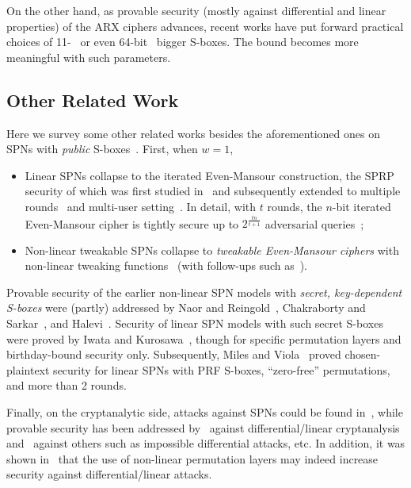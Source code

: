 \documentclass[journal=tosc,final,nohyperref]{iacrtrans}
\begin{document}
On the other hand, as provable security (mostly against differential and linear properties) of the ARX ciphers advances, recent works have put forward practical choices of 11-~\cite{DBLP:journals/tosc/16-bit-Sbox} or even 64-bit~\cite{cryptoeprint:2019:1378} bigger S-boxes. The bound becomes more meaningful with such parameters.




\subsection{Other Related Work}


Here we survey some other related works besides the aforementioned ones on SPNs with {\it public} S-boxes~\cite{EC:DSSL16,EPRINT:DKSTZ17,EPRINT:CogLee18,C:CDKLST18}. First, when $w=1$,
%
\begin{itemize}
	\item Linear SPNs collapse to the iterated Even-Mansour construction, the SPRP security of which was first studied in~\cite{JC:EveMan97} and subsequently extended to multiple rounds~\cite{EC:BKLSST12,EPRINT:Steinberger12,AC:LamPatSeu12,EC:CheSte14,JC:CLLSS18,C:HoaTes16} and multi-user setting~\cite{C:HoaTes16}. In detail, with $t$ rounds, the $n$-bit iterated Even-Mansour cipher is tightly secure up to $2^{\frac{tn}{t+1}}$ adversarial queries~\cite{EC:BKLSST12,EC:CheSte14,C:HoaTes16};
	\item Non-linear tweakable SPNs collapse to {\it tweakable Even-Mansour ciphers} with non-linear tweaking functions~\cite{C:CogLamSeu15} (with follow-ups such as~\cite{AC:CogSeu15,EC:GJMN16,C:Mennink16}).
\end{itemize}
%
Provable security of the earlier non-linear SPN models with {\it secret, key-dependent S-boxes} were (partly) addressed by Naor and Reingold~\cite{JC:NaoRei99}, Chakraborty and Sarkar~\cite{FSE:ChaSar06}, and Halevi~\cite{C:Halevi07}. Security of linear SPN models with such secret S-boxes were proved by Iwata and Kurosawa~\cite{FSE:IwaKur00}, though for specific permutation layers and birthday-bound security only. Subsequently, Miles and Viola~\cite{miles2015substitution} proved chosen-plaintext security for linear SPNs with PRF S-boxes, ``zero-free'' permutations, and more than 2 rounds.


Finally, on the cryptanalytic side, attacks against SPNs could be found in~\cite{EC:Joux03,RSA:HalRog04,JC:BirSha10,AC:BirBouKho14,cryptoeprint:2015:646,cryptoeprint:2015:646}, while provable security has been addressed by~\cite{IMA:DaeRij01,AC:PSCYL02,FSE:PSLL03,miles2015substitution} against differential/linear cryptanalysis and~\cite{EC:SLGRL16} against others such as impossible differential attacks, etc. In addition, it was shown in~\cite{DBLP:journals/dcc/LiuRL18} that the use of non-linear permutation layers may indeed increase security against differential/linear attacks.
\end{document}
